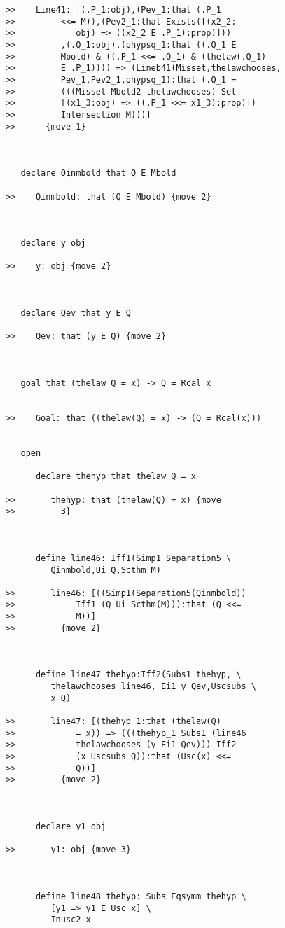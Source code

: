 \documentclass[12pt]{article}
\begin{document}
\begin{verbatim}
>>    Line41: [(.P_1:obj),(Pev_1:that (.P_1
>>         <<= M)),(Pev2_1:that Exists([(x2_2:
>>            obj) => ((x2_2 E .P_1):prop)]))
>>         ,(.Q_1:obj),(phypsq_1:that ((.Q_1 E
>>         Mbold) & ((.P_1 <<= .Q_1) & (thelaw(.Q_1)
>>         E .P_1)))) => (Lineb41(Misset,thelawchooses,
>>         Pev_1,Pev2_1,phypsq_1):that (.Q_1 =
>>         (((Misset Mbold2 thelawchooses) Set
>>         [(x1_3:obj) => ((.P_1 <<= x1_3):prop)])
>>         Intersection M)))]
>>      {move 1}



   declare Qinmbold that Q E Mbold

>>    Qinmbold: that (Q E Mbold) {move 2}



   declare y obj

>>    y: obj {move 2}



   declare Qev that y E Q

>>    Qev: that (y E Q) {move 2}



   goal that (thelaw Q = x) -> Q = Rcal x


>>    Goal: that ((thelaw(Q) = x) -> (Q = Rcal(x)))


   open

      declare thehyp that thelaw Q = x

>>       thehyp: that (thelaw(Q) = x) {move
>>         3}



      define line46: Iff1(Simp1 Separation5 \
         Qinmbold,Ui Q,Scthm M)

>>       line46: [((Simp1(Separation5(Qinmbold))
>>            Iff1 (Q Ui Scthm(M))):that (Q <<=
>>            M))]
>>         {move 2}



      define line47 thehyp:Iff2(Subs1 thehyp, \
         thelawchooses line46, Ei1 y Qev,Uscsubs \
         x Q)

>>       line47: [(thehyp_1:that (thelaw(Q)
>>            = x)) => (((thehyp_1 Subs1 (line46
>>            thelawchooses (y Ei1 Qev))) Iff2
>>            (x Uscsubs Q)):that (Usc(x) <<=
>>            Q))]
>>         {move 2}



      declare y1 obj

>>       y1: obj {move 3}



      define line48 thehyp: Subs Eqsymm thehyp \
         [y1 => y1 E Usc x] \
         Inusc2 x


\end{verbatim}
\end{document}
